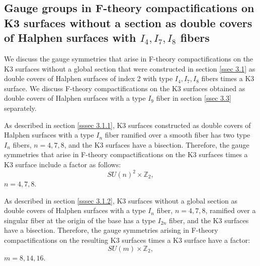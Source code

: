 \documentclass[12pt]{article}
\def\Z{\mathbb{Z}}
\begin{document}
\subsection{Gauge groups in F-theory compactifications on K3 surfaces without a section as double covers of Halphen surfaces with $I_4, I_7, I_8$ fibers}
\label{ssec 3.2}
We discuss the gauge symmetries that arise in F-theory compactifications on the K3 surfaces without a global section that were constructed in section \ref{ssec 3.1} as double covers of Halphen surfaces of index 2 with type $I_4, I_7, I_8$ fibers times a K3 surface. We discuss F-theory compactifications on the K3 surfaces obtained as double covers of Halphen surfaces with a type $I_9$ fiber in section \ref{ssec 3.3} separately. 
\par As described in section \ref{sssec 3.1.1}, K3 surfaces constructed as double covers of Halphen surfaces with a type $I_n$ fiber ramified over a smooth fiber has two type $I_n$ fibers, $n=4,7,8$, and the K3 surfaces have a bisection. Therefore, the gauge symmetries that arise in F-theory compactifications on the K3 surfaces times a K3 surface include a factor as follows:
\begin{equation}
SU(n)^2 \times \Z_2,
\end{equation}
$n=4,7,8$.
\par As described in section \ref{sssec 3.1.2}, K3 surfaces without a global section as double covers of Halphen surfaces with a type $I_n$ fiber, $n=4,7,8$, ramified over a singular fiber at the origin of the base has a type $I_{2n}$ fiber, and the K3 surfaces have a bisection. Therefore, the gauge symmetries arising in F-theory compactifications on the resulting K3 surfaces times a K3 surface have a factor:
\begin{equation}
SU(m) \times \Z_2,
\end{equation}
$m=8,14,16$.
\end{document}
